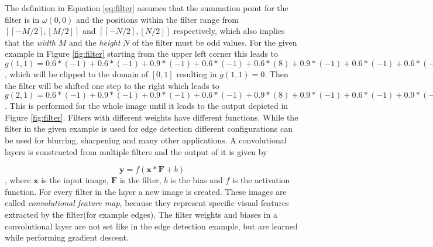 The definition in Equation \ref{eq:filter} assumes that the summation point for the filter is in $\omega(0,0)$ and the positions within the filter range from $[\left \lceil-M/2 \right \rceil, \left \lfloor M/2 \right \rfloor]$ and $[\left \lceil-N/2 \right \rceil, \left \lfloor N/2 \right \rfloor]$ respectively, which also implies that the \emph{width} $M$ and the \emph{height} $N$ of the filter must be odd values.
For the given example in Figure \ref{fig:filter} starting from the upper left corner this leads to $g(1,1) = 0.6 * (-1) + 0.6 * (-1) + 0.9 * (-1) + 0.6 * (-1) + 0.6 * (8) + 0.9 * (-1) + 0.6 * (-1) + 0.6 * (-1) + 0.9 * (-1) = -0.9 $, which will be clipped to the domain of $[0,1]$ resulting in $g(1,1) = 0$.
Then the filter will be shifted one step to the right which leads to $g(2,1) = 0.6 * (-1) + 0.9 * (-1) + 0.9 * (-1) + 0.6 * (-1) + 0.9 * (8) + 0.9 * (-1) + 0.6 * (-1) + 0.9 * (-1) + 0.9 * (-1) = 0.9$. This is performed for the whole image until it leads to the output depicted in Figure \ref{fig:filter}.
Filters with different weights have different functions.
While the filter in the given example is used for edge detection different configurations can be used for blurring, sharpening and many other applications. 
A convolutional layers is constructed from multiple filters and the output of it is given by

\begin{equation}
\mathbf{y}= f(\mathbf{x} * \mathbf{F} + b)
\end{equation},
where $\mathbf{x}$ is the input image, $\mathbf{F}$ is the filter, $b$ is the bias and $f$ is the activation function.
For every filter in the layer a new image is created. 
These images are called \emph{convolutional feature map}, because they represent specific visual features extracted by the filter(for example edges).
The filter weights and biases in a convolutional layer are not set like in the edge detection example, but are learned while performing gradient descent.
